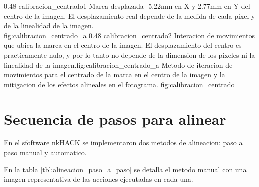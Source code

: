 \subfigab
{0.48} {calibracion_centrado1} {Marca desplazada -5.22mm en X y 2.77mm en Y del centro de la imagen. El desplazamiento real depende de la medida de cada pixel y de la linealidad de la imagen.\\ \vphantom{1}}{fig:calibracion_centrado_a}
{0.48} {calibracion_centrado2} {Interacion de movimientos que ubica la marca en el centro de la imagen. El desplazamiento del centro es practicamente nulo, y por lo tanto no depende de la dimension de los pixeles ni la linealidad de la imagen.}{fig:calibracion_centrado_a}
   {Metodo de iteracion de movimientos para el centrado de la marca en el centro de la imagen y la mitigacion de los efectos alineales en el fotograma.}
   {fig:calibracion_centrado}

\section{Secuencia de pasos para alinear}

En el sfoftware nkHACK se implementaron dos metodos de alineacion: paso a paso manual y automatico.\par
En la tabla \ref{tbl:alineacion_paso_a_paso} se detalla el metodo manual con una imagen representativa de las acciones ejecutadas en cada una. 

